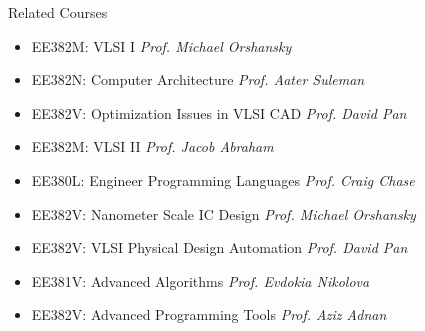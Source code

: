 
\begin{rSection}{Related Courses}

\begin{itemize}
\item EE382M:  VLSI  I  \hfill{\em Prof.  Michael  Orshansky}
\item EE382N:  Computer  Architecture  \hfill{\em Prof.  Aater  Suleman} 
\item EE382V:  Optimization  Issues  in  VLSI  CAD  \hfill{\em Prof.  David  Pan}
\item EE382M:  VLSI  II  \hfill{\em Prof.  Jacob  Abraham}
\item EE380L:  Engineer  Programming  Languages  \hfill{\em Prof.  Craig  Chase}
\item EE382V:  Nanometer  Scale  IC  Design  \hfill{\em Prof.  Michael  Orshansky}
\item EE382V:  VLSI  Physical  Design  Automation  \hfill{\em Prof.  David  Pan} 
\item EE381V:  Advanced  Algorithms  \hfill{\em Prof.  Evdokia  Nikolova}
\item EE382V:  Advanced  Programming  Tools  \hfill{\em Prof.  Aziz  Adnan}
\end{itemize}

\end{rSection}
